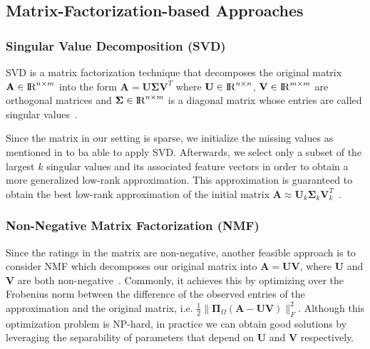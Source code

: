 \documentclass[10pt,conference,compsocconf]{IEEEtran}
\begin{document}
    \subsection{Matrix-Factorization-based Approaches}

    \subsubsection{Singular Value Decomposition (SVD)}

    SVD is a matrix factorization technique that decomposes the original matrix $\mathbf{A} \in {\rm I\!R}^{n \times m} $ into the form $ \mathbf{A} = \mathbf{U \Sigma V}^T $ where $\mathbf{U} \in {\rm I\!R}^{n \times n}$,  $\mathbf{V}  \in {\rm I\!R}^{m \times m}$ are orthogonal matrices and $\mathbf{\Sigma} \in {\rm I\!R}^{n \times m}$ is a diagonal matrix whose entries are called singular values~\cite{svd}.

    Since the matrix in our setting is sparse, we initialize the missing values as mentioned in  to ba able to apply SVD.
    Afterwards, we select only a subset of the largest $k$ singular values and its associated feature vectors in order to obtain a more generalized low-rank approximation.
    This approximation is guaranteed to obtain the best low-rank approximation of the initial matrix $\mathbf{A}\approx \mathbf{U}_k \mathbf{\Sigma}_k \mathbf{V}^T_k$~\cite{Eckart1936}.

    \subsubsection{Non-Negative Matrix Factorization (NMF)}

    Since the ratings in the matrix are non-negative, another feasible approach is to consider NMF which decomposes our original matrix into $\mathbf{A} = \mathbf{UV}$, where $\mathbf{U}$ and $\mathbf{V}$ are both non-negative~\cite{gillis2014nonnegative}.
    Commonly, it achieves this by optimizing over the Frobenius norm between the difference of the observed entries of the approximation and the original matrix, i.e. $ \frac{1}{2}\|\mathbf{\Pi}_{\Omega}(\mathbf{A} - \mathbf{UV})\|^2_F$.
    Although this optimization problem is NP-hard, in practice we can obtain good solutions by leveraging the separability of parameters that depend on $\mathbf{U}$ and $\mathbf{V}$ respectively.
\end{document}
